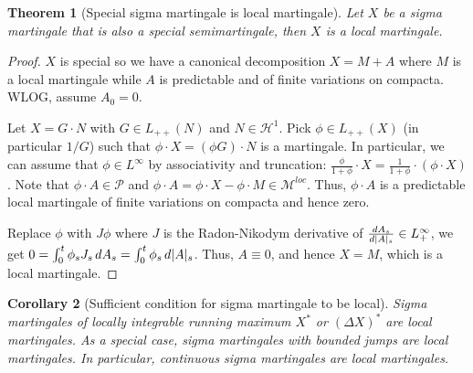 \documentclass[openany,oneside]{book}
\newtheorem{thm}{Theorem}[section]
\newtheorem{cor}[thm]{Corollary}
\theoremstyle{definition}
\theoremstyle{remark}
\DeclarePairedDelimiter{\abs}{\lvert}{\rvert} %
\newcommand{\pred}{\mathcal{P}} %
\begin{document}
\begin{thm}[Special sigma martingale is local martingale]
Let $X$ be a sigma martingale that is also a special semimartingale, then $X$ is a local martingale.
\end{thm}
\begin{proof}
$X$ is special so we have a canonical decomposition $X=M+A$ where $M$ is a local martingale while $A$ is predictable and of finite variations on compacta. WLOG, assume $A_0 =0$.
\par
Let $X=G\cdot N$ with $G\in L_{++}(N)$ and $N\in \mathcal{H}^1$. Pick $\phi \in L_{++}(X)$ (in particular $1/G$) such that $\phi \cdot X = (\phi G) \cdot N$ is a martingale. In particular, we can assume that $\phi \in L^\infty$ by associativity and truncation: $\frac{\phi}{1+\phi} \cdot X = \frac{1}{1+\phi} \cdot (\phi \cdot X)$. Note that $\phi \cdot A \in \pred$ and $\phi \cdot A = \phi \cdot X - \phi \cdot M \in \mathcal{M}^{loc}$. Thus, $\phi \cdot A$ is a predictable local martingale of finite variations on compacta and hence zero.
\par
Replace $\phi$ with $J \phi$ where $J$ is the Radon-Nikodym derivative of $\frac{d A_s}{d \abs{A}_s} \in L^\infty_+$, we get $0 = \int_0^t \phi_s J_s \,d A_s = \int_0^t \phi_s \,d \abs{A}_s$. Thus, $A \equiv 0$, and hence $X=M$, which is a local martingale.
\end{proof}

\begin{cor}[Sufficient condition for sigma martingale to be local]
Sigma martingales of locally integrable running maximum $X^\ast$ or $(\Delta X)^\ast$ are local martingales. As a special case, sigma martingales with bounded jumps are local martingales. In particular, continuous sigma martingales are local martingales.
\end{cor}
\end{document}
